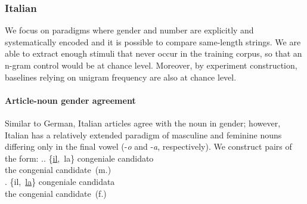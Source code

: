
\subsubsection{Italian} %
We focus on paradigms where gender and number are explicitly and
systematically encoded and it is possible to compare same-length
strings. We are able to extract enough stimuli that never occur in the
training corpus, so that an n-gram control would be at chance
level. Moreover, by experiment construction, baselines relying on
unigram frequency are also at chance level.

\paragraph{Article-noun gender agreement}

Similar to German, Italian articles agree with the noun in gender; however, Italian has a relatively extended paradigm of masculine and feminine nouns differing only in the final vowel (-\emph{o} and -\emph{a}, respectively). We construct pairs %
of the form:
\ex.\ag. \{\underline{il},\ la\}  congeniale  candidato \\
the congenial candidate\ (m.) \\
\bg.  \{il,\ \underline{la}\}  congeniale  candidata \\
the congenial candidate\ (f.) \\


